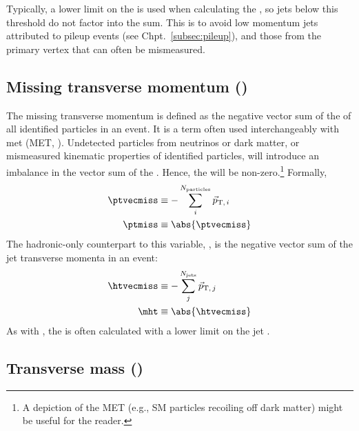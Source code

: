 Typically, a lower limit on the \pt is used when calculating the \HT, so \glspl{jet} below this threshold do not factor into the sum. This is to avoid low momentum \glspl{jet} attributed to pileup events (see Chpt.~\ref{subsec:pileup}), and those from the primary vertex that can often be mismeasured.




\subsection{Missing transverse momentum (\texorpdfstring{\ptvecmiss}{ptmiss})}
\label{subsec:objects_met}

The missing transverse momentum \ptvecmiss is defined as the negative vector sum of the \ptvec of all identified particles in an event. It is a term often used interchangeably with \gls{met} (MET, \VEtmiss). Undetected particles from neutrinos or dark matter, or mismeasured kinematic properties of identified particles, will introduce an imbalance in the vector sum of the \ptvec. Hence, the \ptvecmiss will be non-zero.\footnote{A depiction of the MET (e.g., SM particles recoiling off dark matter) might be useful for the reader.} Formally,
\begin{equation}
    \begin{aligned}
        \ptvecmiss &\equiv - \sum_i^{N_{\mathrm{particles}}} \vec{p}_{\mathrm{T}, \, i} \\
        \ptmiss &\equiv \abs{\ptvecmiss}
    \end{aligned}
    \label{eq:met_definition}
\end{equation}
The hadronic-only counterpart to this variable, \htvecmiss, is the negative vector sum of the \gls{jet} transverse momenta in an event:
\begin{equation}
    \begin{aligned}
        \htvecmiss &\equiv - \sum_j^{N_{\mathrm{jets}}} \vec{p}_{\mathrm{T}, \, j} \\
        \mht &\equiv \abs{\htvecmiss}
    \end{aligned}
    \label{eq:mht_definition}
\end{equation}
As with \HT, the \mht is often calculated with a lower limit on the \gls{jet} \pt.




\subsection{Transverse mass (\texorpdfstring{\mT}{MT})}
\label{subsec:objects_transverse_mass}

